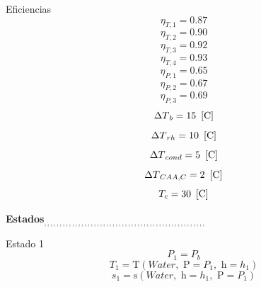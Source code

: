 \documentclass[10pt,fleqn]{article}
\theoremstyle{mytheoremstyle}
\theoremstyle{mytheoremstyle}
\theoremstyle{myproblemstyle}
\newcommand{\F}[1]{\mbox{$#1$}}
\newcommand{\temperature}{\mathrm{T}}
\newcommand{\entropy}{\mathrm{s}}
\begin{document}
\vspace{0.10in}
\noindent
{\color{blue} \rm Eficiencias}
\begin{equation}
\label{EES Eqn:19}
\eta_{T,1}=0.87 
\end{equation}
\begin{equation}
\label{EES Eqn:20}
\eta_{T,2}=0.90 
\end{equation}
\begin{equation}
\label{EES Eqn:21}
\eta_{T,3}=0.92 
\end{equation}
\begin{equation}
\label{EES Eqn:22}
\eta_{T,4}=0.93 
\end{equation}
\begin{equation}
\label{EES Eqn:23}
\eta_{P,1}=0.65 
\end{equation}
\begin{equation}
\label{EES Eqn:24}
\eta_{P,2}=0.67 
\end{equation}
\begin{equation}
\label{EES Eqn:25}
\eta_{P,3}=0.69 
\end{equation}
\begin{equation}
\label{EES Eqn:26}
{\Delta T}_{b} = 15   \   \left[ \rm C \right] 
\end{equation}
{\color{blue} \rm}
\begin{equation}
\label{EES Eqn:27}
{\Delta T}_{rh} = 10   \   \left[ \rm C \right] 
\end{equation}
{\color{blue} \rm}
\begin{equation}
\label{EES Eqn:28}
{\Delta T}_{cond} = 5   \   \left[ \rm C \right] 
\end{equation}
{\color{blue} \rm}
\begin{equation}
\label{EES Eqn:29}
{\Delta T}_{CAA,C} = 2   \   \left[ \rm C \right] 
\end{equation}
{\color{blue} \rm}
\begin{equation}
\label{EES Eqn:30}
T_{c} = 30   \   \left[ \rm C \right] 
\end{equation}
{\color{blue} \rm}

\vspace{0.10in}
\noindent
{\color{red} \bf Estados$_{,,,,,,,,,,,,,,,,,,,,,,,,,,,,,,,,,,,,,,,,,,,,,,,,,,,,}$}

\vspace{0.10in}
\noindent
{\color{blue} \rm Estado 1}
\begin{equation}
\label{EES Eqn:31}
P_{1}=P_{b} 
\end{equation}
\begin{equation}
\label{EES Eqn:32}
T_{1}=\temperature \left(\F{Water},\mbox{\ P}=P_{1},\mbox{\ h}=h_{1} \right)  
\end{equation}
\begin{equation}
\label{EES Eqn:33}
s_{1}=\entropy \left(\F{Water},\mbox{\ h}=h_{1},\mbox{\ P}=P_{1} \right)  
\end{equation}
\end{document}
